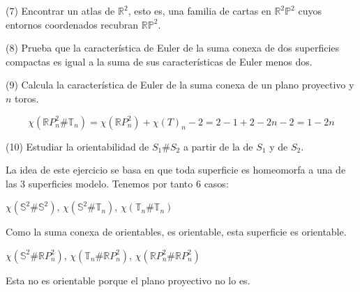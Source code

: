 \documentclass[
  a4paper,
  spanish,
  12pt,
]{scrartcl}
\begin{document}
\begin{ejer}
(7) Encontrar un atlas de $\mathbb{R}^{2}$, esto es, una familia de cartas en $\mathbb{R}^{2} \mathbb{P}^{2}$ cuyos entornos coordenados recubran $\mathbb{R} \mathbb{P}^{2}$.\\
\end{ejer}

\begin{ejer}
(8) Prueba que la característica de Euler de la suma conexa de dos superficies compactas es igual a la suma de sus características de Euler menos dos.\\
\end{ejer}

\begin{ejer}
(9) Calcula la característica de Euler de la suma conexa de un plano proyectivo y $n$ toros.\\
\end{ejer}

\begin{sol}
$$
\chi(\mathbb{R}P^2_n \# \mathbb{T}_n) = \chi(\mathbb{R}P^2_n) + \chi(T)_n - 2 = 2 - 1 + 2 - 2n - 2 = 1 -2n
$$
\end{sol}

\begin{ejer}
(10) Estudiar la orientabilidad de $S_{1} \# S_{2}$ a partir de la de $S_{1}$ y de $S_{2}$.\\
\end{ejer}

\begin{sol}
La idea de este ejercicio se basa en que toda superficie es homeomorfa a una de las 3 superficies modelo.
Tenemos por tanto 6 casos:

$\chi(\mathbb{S}^2 \# \mathbb{S}^2)$, $\chi(\mathbb{S}^2 \# \mathbb{T}_n)$, $\chi(\mathbb{T}_n \# \mathbb{T}_n)$

Como la suma conexa de orientables, es orientable, esta superficie es orientable.

$\chi(\mathbb{S}^2 \# \mathbb{R}P^2_n)$, $\chi(\mathbb{T}_n \# \mathbb{R}P^2_n)$, $\chi(\mathbb{R}P^2_n \# \mathbb{R}P^2_n)$

Esta no es orientable porque el plano proyectivo no lo es.

\end{sol}
\end{document}
